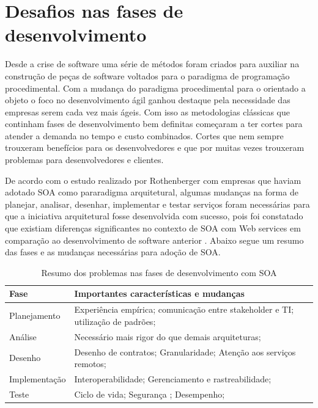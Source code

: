 \documentclass[
	article,			%
	11pt,				%
	oneside,			%
	a4paper,			%
	english,			%
	brazil,				%
	sumario=tradicional
	]{abntex2}
\begin{document}
\section{Desafios nas fases de desenvolvimento}
Desde a crise de software uma série de métodos foram criados para auxiliar na construção de peças de software voltados para o paradigma de programação procedimental. Com a mudança do paradigma procedimental para o orientado a objeto o foco no desenvolvimento ágil ganhou destaque pela necessidade das empresas serem cada vez mais ágeis. Com isso as metodologias clássicas que continham fases de desenvolvimento bem definitas começaram a ter cortes para atender a demanda no tempo e custo combinados. Cortes que nem sempre trouxeram benefícios para os desenvolvedores  e que por muitas vezes trouxeram problemas para desenvolvedores e clientes. 

De acordo com o estudo realizado por Rothenberger com empresas que haviam adotado SOA como pararadigma arquitetural, algumas mudanças na forma de planejar, analisar, desenhar, implementar e testar serviços foram necessárias para que a iniciativa arquitetural fosse desenvolvida com sucesso, pois foi constatado que existiam diferenças significantes no contexto de SOA com Web services em comparação ao desenvolvimento de software anterior \cite{Rothenberger2010}. Abaixo segue um resumo das fases e as mudanças necessárias para adoção de SOA.

\begin{table}
\centering
\caption{Resumo dos problemas nas fases de desenvolvimento com SOA}
  \begin{tabularx}{\linewidth}{ | l | X |  }
    \hline Fase & Importantes características e mudanças \\ \hline

	Planejamento
	&
   	Experiência empírica; comunicação entre stakeholder e TI; utilização de padrões;
	 \\ \hline
	Análise
	&
  	Necessário mais rigor do que demais arquiteturas;
	 \\ \hline
	Desenho
	&
	Desenho de contratos; Granularidade; Atenção aos serviços remotos;
	 \\ \hline
	Implementação
	&
	Interoperabilidade; Gerenciamento e rastreabilidade;
	 \\ \hline
	Teste
	&
	Ciclo de vida; Segurança ; Desempenho;
	 \\ \hline

  \end{tabularx}
\end{table}
\end{document}
